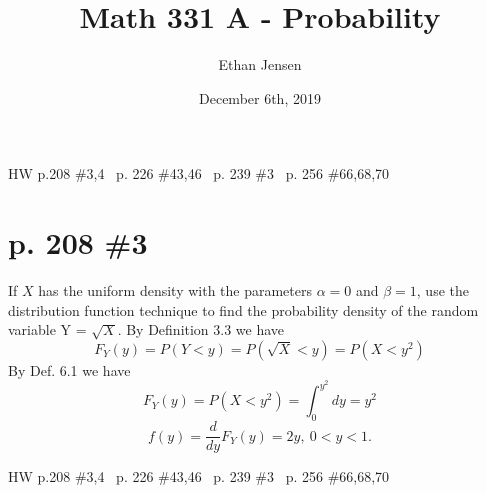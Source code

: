 \documentclass[12pt]{article}
\title{Math 331 A - Probability}
\author{Ethan Jensen}
\date{December 6th, 2019}
\begin{document}
	\maketitle HW p.208 \#3,4 \ p. 226 \#43,46 \ p. 239 \#3 \ p. 256 \#66,68,70
	\section[20pt]{p. 208 \#3}
	If \(X\) has the uniform density with the parameters \(\alpha=0\) and  \(\beta=1\), use the distribution function technique to find the probability density of the random variable Y = \(\sqrt{X}\). \newline \newline
	By Definition 3.3 we have
	\[F_Y(y)=P(Y<y)=P(\sqrt{X}<y)=P(X<y^2)\]
	By Def. 6.1 we have
	\[F_Y(y)=P(X<y^2)=\int_0^{y^2}dy=y^2\]
	\[f(y)=\frac{d}{dy}F_Y(y)=2y,\ 0 < y < 1.\]
	\newpage
	\maketitle HW p.208 \#3,4 \ p. 226 \#43,46 \ p. 239 \#3 \ p. 256 \#66,68,70
\end{document}
